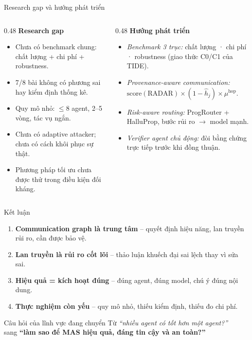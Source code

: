 \documentclass[aspectratio=169,10pt]{beamer}
\begin{document}
\begin{frame}{Research gap và hướng phát triển}
  \begin{columns}[T]
    \begin{column}{0.48\textwidth}
      \textbf{Research gap}
      \begin{itemize}
        \item[G1] Chưa có benchmark chung: chất lượng + chi phí + robustness.
        \item[G2] 7/8 bài không có phương sai hay kiểm định thống kê.
        \item[G3] Quy mô nhỏ: $\le 8$ agent, 2--5 vòng, tác vụ ngắn.
        \item[G4] Chưa có adaptive attacker; chưa có cách khôi phục sự thật.
        \item[G5] Phương pháp tối ưu chưa được thử trong điều kiện đối kháng.
      \end{itemize}
    \end{column}
    \begin{column}{0.48\textwidth}
      \textbf{Hướng phát triển}
      \begin{itemize}
        \item \emph{Benchmark 3 trục:} chất lượng · chi phí · robustness (giao thức C0/C1 của TIDE).
        \item \emph{Provenance-aware communication:}
          $\mathrm{score}(\text{RADAR}) \times (1 - \hat h_j) \times \mu^{\text{hop}}$.
        \item \emph{Risk-aware routing:} ProgRouter + HalluProp, bước rủi ro $\to$ model mạnh.
        \item \emph{Verifier agent chủ động:} đòi bằng chứng trực tiếp trước khi đồng thuận.
      \end{itemize}
    \end{column}
  \end{columns}
\end{frame}

\begin{frame}{Kết luận}
  \begin{enumerate}
    \item \textbf{Communication graph là trung tâm} -- quyết định hiệu năng, lan truyền rủi ro, cần được bảo vệ.
    \item \textbf{Lan truyền là rủi ro cốt lõi} -- thảo luận khuếch đại sai lệch thay vì sửa sai.
    \item \textbf{Hiệu quả = kích hoạt đúng} -- đúng agent, đúng model, chú ý đúng nội dung.
    \item \textbf{Thực nghiệm còn yếu} -- quy mô nhỏ, thiếu kiểm định, thiếu đo chi phí.
  \end{enumerate}
  \vspace{6pt}
  \begin{block}{Câu hỏi của lĩnh vực đang chuyển}
    Từ \emph{“nhiều agent có tốt hơn một agent?”}\\
    sang \textbf{“làm sao để MAS hiệu quả, đáng tin cậy và an toàn?”}
  \end{block}
\end{frame}
\end{document}
